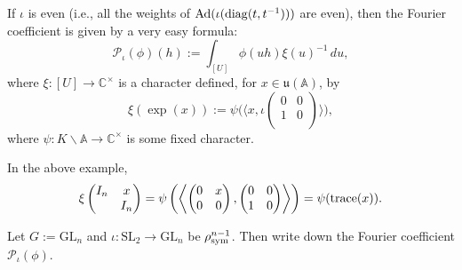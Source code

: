 \documentclass[reqno]{amsart} 
\numberwithin{theorem}{section}
\numberwithin{equation}{section}
\numberwithin{exercise}{section}
\begin{document}
\begin{enumerate}
  If $\iota$ is even (i.e., all the weights of $\operatorname{Ad}(\iota(\operatorname{diag}(t, t^{-1})))$ are even), then the Fourier coefficient is given by a very easy formula:
  \begin{equation}\label{eq:cq6thc26pn}
    \mathcal{P}_\iota(\phi)(h) := \int_{[U]} \phi(u h) \xi(u)^{-1} \, d u,
  \end{equation}
  where $\xi :[U] \rightarrow \mathbb{C}^\times$ is a character defined, for $x \in \mathfrak{u}(\mathbb{A})$, by
  \begin{equation*}
    \xi(\exp(x)) := \psi \bigl( \langle x, \iota \left(
      \begin{smallmatrix}
        0&0\\
        1&0 \\
      \end{smallmatrix}
    \right) \rangle \bigr),
  \end{equation*}
  where $\psi : K \backslash \mathbb{A} \rightarrow \mathbb{C}^\times$ is some fixed character.
  \begin{example}\label{example:cq6ueb2vh0}
    In the above example,
    \begin{equation*}
      \xi
      \begin{pmatrix}
        I_n    & x \\
                                                                                        & I_n \\
      \end{pmatrix}
      = \psi \left( \left\langle
          \begin{pmatrix}
            0        & x \\
            0 & 0 \\
          \end{pmatrix},
          \begin{pmatrix}
            0        & 0 \\
            1 & 0 \\
          \end{pmatrix} \right\rangle \right)
      = \psi(\operatorname{trace}(x)).
    \end{equation*}
  \end{example}
  \begin{exercise}\label{exercise:cq6ueb2mev}
    Let $G := \mathrm{GL}_n$ and $\iota : \mathrm{SL}_2 \rightarrow \mathrm{GL}_n$ be $\rho_{\operatorname{sym}}^{n - 1}$.  Then write down the Fourier coefficient $\mathcal{P}_\iota(\phi)$.
  \end{exercise}


\end{enumerate}
\end{document}
